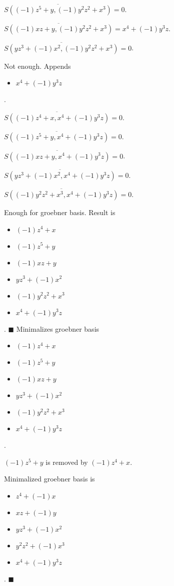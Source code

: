 \documentclass{jsarticle}
\begin{document}
$\overline{S((-1)z^{5}+y, (-1)y^{2}z^{2}+x^{3})} = 0$.  

$\overline{S((-1)xz+y, (-1)y^{2}z^{2}+x^{3})} = x^{4}+(-1)y^{3}z$.  

$\overline{S(yz^{3}+(-1)x^{2}, (-1)y^{2}z^{2}+x^{3})} = 0$.  

Not enough.  Appends \begin{itemize}
\item $x^{4}+(-1)y^{3}z$
\end{itemize}  . 


$\overline{S((-1)z^{4}+x, x^{4}+(-1)y^{3}z)} = 0$.  

$\overline{S((-1)z^{5}+y, x^{4}+(-1)y^{3}z)} = 0$.  

$\overline{S((-1)xz+y, x^{4}+(-1)y^{3}z)} = 0$.  

$\overline{S(yz^{3}+(-1)x^{2}, x^{4}+(-1)y^{3}z)} = 0$.  

$\overline{S((-1)y^{2}z^{2}+x^{3}, x^{4}+(-1)y^{3}z)} = 0$.  

Enough for groebner basis.  Result is \begin{itemize}
\item $(-1)z^{4}+x$
\item $(-1)z^{5}+y$
\item $(-1)xz+y$
\item $yz^{3}+(-1)x^{2}$
\item $(-1)y^{2}z^{2}+x^{3}$
\item $x^{4}+(-1)y^{3}z$
\end{itemize}  . 
$\blacksquare{}$
Minimalizes groebner basis 
\begin{itemize}
\item $(-1)z^{4}+x$
\item $(-1)z^{5}+y$
\item $(-1)xz+y$
\item $yz^{3}+(-1)x^{2}$
\item $(-1)y^{2}z^{2}+x^{3}$
\item $x^{4}+(-1)y^{3}z$
\end{itemize}  . 


$(-1)z^{5}+y$ is removed by $(-1)z^{4}+x$.  

Minimalized groebner basis is 
\begin{itemize}
\item $z^{4}+(-1)x$
\item $xz+(-1)y$
\item $yz^{3}+(-1)x^{2}$
\item $y^{2}z^{2}+(-1)x^{3}$
\item $x^{4}+(-1)y^{3}z$
\end{itemize}  . 
$\blacksquare{}$
\end{document}
